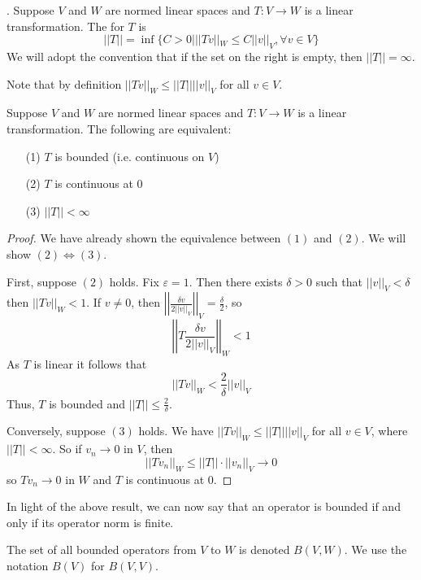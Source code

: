 \begin{defn}.
    Suppose $V$ and $W$ are normed linear spaces and $T:V\rightarrow W$ is a linear transformation. The  for $T$ is $$||T|| = \inf\{C> 0|||Tv||_W \leq C||v||_V,\forall v \in V\}$$ We will adopt the convention that if the set on the right is empty, then $||T|| = \infty$. 
\end{defn}

Note that by definition $||Tv||_W \leq ||T||||v||_V$ for all $v \in V$.

\begin{prop}
    Suppose $V$ and $W$ are normed linear spaces and $T:V\rightarrow W$ is a linear transformation. The following are equivalent: \begin{itemize}
        \item[(1)] $T$ is bounded (i.e. continuous on $V$) 
        \item[(2)] $T$ is continuous at $0$
        \item[(3)] $||T|| < \infty$
    \end{itemize}
\end{prop}
\begin{proof}
    We have already shown the equivalence between $(1)$ and $(2)$. We will show $(2) \iff (3)$. 

    First, suppose $(2)$ holds. Fix $\varepsilon = 1$. Then there exists $\delta > 0$ such that $||v||_V < \delta$ then $||Tv||_W < 1$. If $v \neq 0$, then $\left|\left|\frac{\delta v}{2||v||_V}\right|\right|_V = \frac{\delta}{2}$, so $$\left|\left|T\frac{\delta v}{2||v||_V}\right|\right|_W < 1$$ As $T$ is linear it follows that $$||Tv||_W < \frac{2}{\delta}||v||_V$$ Thus, $T$ is bounded and $||T|| \leq \frac{2}{\delta}$.

    Conversely, suppose $(3)$ holds. We have $||Tv||_W \leq ||T||||v||_V$ for all $v \in V$, where $||T|| < \infty$. So if $v_n\rightarrow 0$ in $V$, then $$||Tv_n||_W \leq ||T||\cdot||v_n||_V\rightarrow 0$$ so $Tv_n\rightarrow 0$ in $W$ and $T$ is continuous at $0$.
\end{proof}

In light of the above result, we can now say that an operator is bounded if and only if its operator norm is finite.

\begin{defn}
    The set of all bounded operators from $V$ to $W$ is denoted $B(V,W)$. We use the notation $B(V)$ for $B(V,V)$.
\end{defn}

